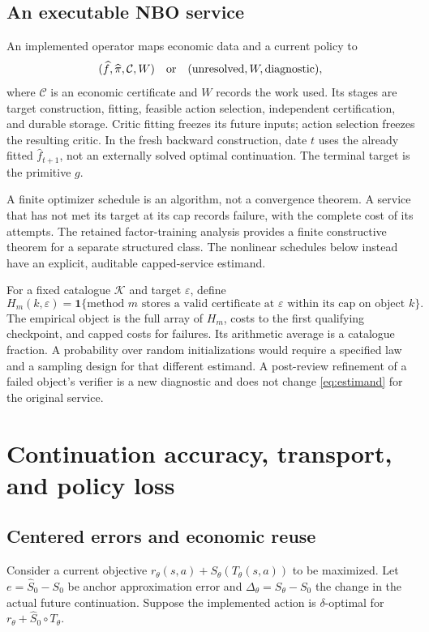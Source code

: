\documentclass[ecta,nameyear,draft]{econsocart}
\begin{document}
\subsection{An executable NBO service}
An implemented operator maps economic data and a current policy to
\[
 (\widehat f,\widehat\pi,\mathcal C,W)\quad\hbox{or}\quad
 (\mathrm{unresolved},W,\mathrm{diagnostic}),
\]
where $\mathcal C$ is an economic certificate and $W$ records the work used. Its stages are target construction, fitting, feasible action selection, independent certification, and durable storage. Critic fitting freezes its future inputs; action selection freezes the resulting critic. In the fresh backward construction, date $t$ uses the already fitted $\widehat f_{t+1}$, not an externally solved optimal continuation. The terminal target is the primitive $g$.

A finite optimizer schedule is an algorithm, not a convergence theorem. A service that has not met its target at its cap records failure, with the complete cost of its attempts. The retained factor-training analysis provides a finite constructive theorem for a separate structured class. The nonlinear schedules below instead have an explicit, auditable capped-service estimand.

For a fixed catalogue $\mathcal K$ and target $\varepsilon$, define
\begin{equation}\label{eq:estimand}
 H_m(k,\varepsilon)=\mathbf1\{\text{method $m$ stores a valid certificate
 at $\varepsilon$ within its cap on object $k$}\}.
\end{equation}
The empirical object is the full array of $H_m$, costs to the first qualifying checkpoint, and capped costs for failures. Its arithmetic average is a catalogue fraction. A probability over random initializations would require a specified law and a sampling design for that different estimand. A post-review refinement of a failed object's verifier is a new diagnostic and does not change \eqref{eq:estimand} for the original service.

\section{Continuation accuracy, transport, and policy loss}\label{sec:theory}
\subsection{Centered errors and economic reuse}
Consider a current objective $r_\theta(s,a)+S_\theta(T_\theta(s,a))$ to be maximized. Let $e=\widehat S_0-S_0$ be anchor approximation error and $\Delta_\theta=S_\theta-S_0$ the change in the actual future continuation. Suppose the implemented action is $\delta$-optimal for $r_\theta+\widehat S_0\circ T_\theta$.
\end{document}

